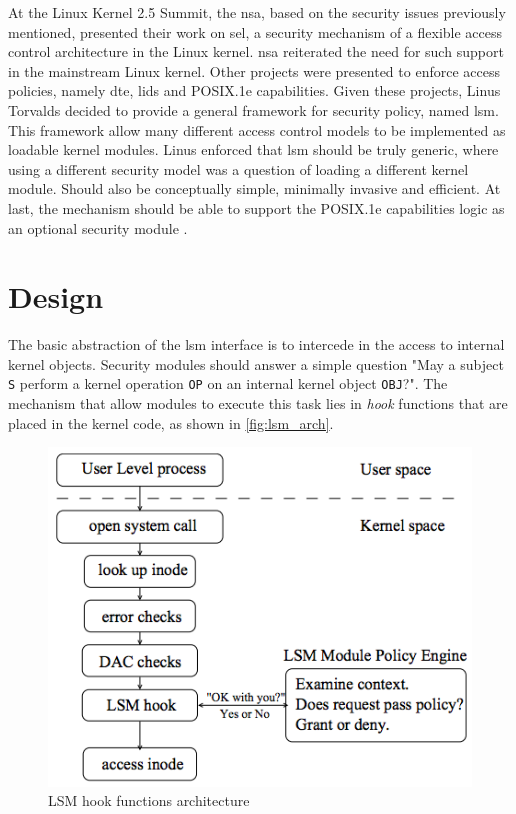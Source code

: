 \documentclass[]{article}
\begin{document}
\noindent
At the Linux Kernel 2.5 Summit, the \gls{nsa}, based on the security issues previously mentioned, presented their work on \gls{sel}, a security mechanism of a flexible access control architecture in the Linux kernel. \gls{nsa} reiterated the need for such support in the mainstream Linux kernel. Other projects were presented to enforce access policies, namely \gls{dte}, \gls{lids} and POSIX.1e capabilities. Given these projects, Linus Torvalds decided to provide a general framework for security policy, named \gls{lsm}. This framework allow many different access control models to be implemented as loadable kernel modules. Linus enforced that \gls{lsm} should be truly generic, where using a different security model was a question of loading a different kernel module. Should also be conceptually simple, minimally invasive and efficient. At last, the mechanism should be able to support the POSIX.1e capabilities logic as an optional security module \cite{WCSMK02}.\\

\section{Design}

The basic abstraction of the \gls{lsm} interface is to intercede in the access to internal kernel objects. Security modules should answer a simple question "May a subject \texttt{S} perform a kernel operation \texttt{OP} on an internal kernel object \texttt{OBJ}?". The mechanism that allow modules to execute this task lies in \textit{hook} functions that are placed in the kernel code, as shown in \autoref{fig:lsm_arch}.

\begin{figure}[htbp]
 \centering
 \includegraphics[scale=0.5]{images/LSM_architecture.png}
 \caption{LSM hook functions architecture}
 \label{fig:lsm_arch}
\end{figure}
\end{document}
